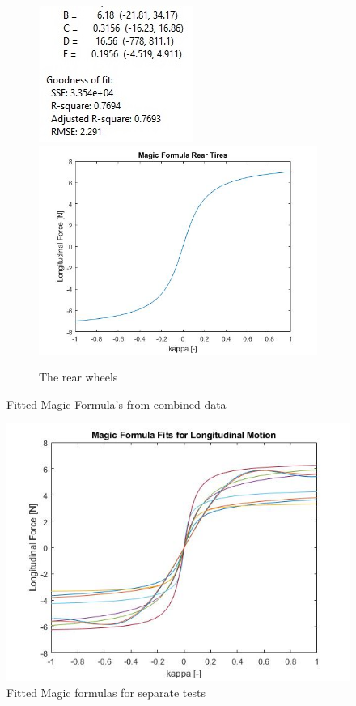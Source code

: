 \begin{figure}
\begin{subfigure}{1\linewidth}
		\includegraphics[scale=1.1]{figure/MagicFormulaRearBagsFitnumbers}
		\includegraphics[scale=0.4]{figure/MagicFormulaRearBagsPic}
		
        \caption{The rear wheels}
        \label{fig:mfrear}
    \end{subfigure}
    \caption{Fitted Magic Formula's from combined data}
    \label{fig:mf}
\end{figure}
\begin{figure}
	\includegraphics[scale=0.4]{figure/SeperateBags.jpg}
    \caption{Fitted Magic formulas for separate tests}
    \label{fig:MagicFormulaSplit}
\end{figure}
